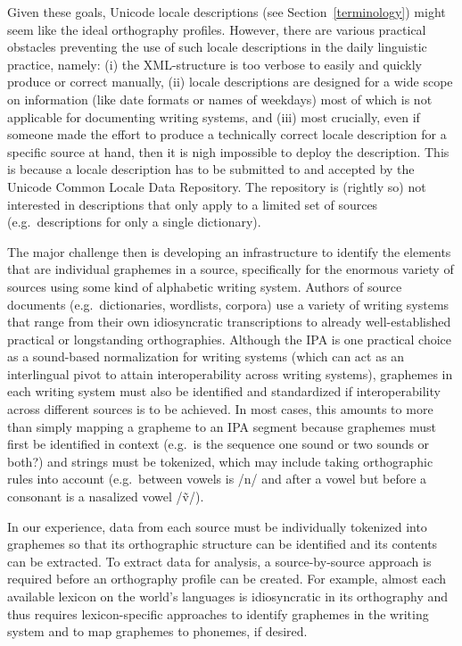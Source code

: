 Given these goals, Unicode locale descriptions (see Section~\ref{terminology})
might seem like the ideal orthography profiles. However, there are various
practical obstacles preventing the use of such locale descriptions in the daily
linguistic practice, namely: (i) the XML-structure is too verbose to easily and
quickly produce or correct manually, (ii) locale descriptions are designed for a
wide scope on information (like date formats or names of weekdays) most of which
is not applicable for documenting writing systems, and (iii) most crucially,
even if someone made the effort to produce a technically correct locale
description for a specific source at hand, then it is nigh impossible to deploy
the description. This is because a locale description has to be submitted to and
accepted by the Unicode Common Locale Data Repository. The repository is
(rightly so) not interested in descriptions that only apply to a limited set of
sources (e.g.~descriptions for only a single dictionary).

The major challenge then is developing an infrastructure to identify the
elements that are individual graphemes in a source, specifically for the
enormous variety of sources using some kind of alphabetic writing system.
Authors of source documents (e.g.~dictionaries, wordlists, corpora) use a
variety of writing systems that range from their own idiosyncratic
transcriptions to already well-established practical or longstanding
orthographies. Although the IPA is one practical choice as a sound-based
normalization for writing systems (which can act as an interlingual pivot to
attain interoperability across writing systems), graphemes in each writing
system must also be identified and standardized if interoperability across
different sources is to be achieved. In most cases, this amounts to more than
simply mapping a grapheme to an IPA segment because graphemes must first be
identified in context (e.g.~is the sequence one sound or two sounds or both?)
and strings must be tokenized, which may include taking orthographic rules into
account (e.g.~between vowels is /n/ and after a vowel but before a consonant is
a nasalized vowel /ṽ/).

In our experience, data from each source must be
individually tokenized into graphemes so that its orthographic structure can be 
identified and its contents can be extracted. To extract data for analysis, a
source-by-source approach is required before an orthography profile can be
created. For example, almost each available lexicon on the world's languages is
idiosyncratic in its orthography and thus requires lexicon-specific approaches
to identify graphemes in the writing system and to map graphemes to phonemes, if
desired.

